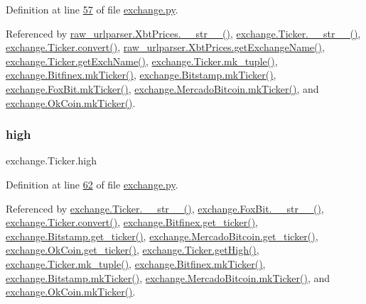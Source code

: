 Definition at line \hyperlink{exchange_8py_source_l00057}{57} of file \hyperlink{exchange_8py_source}{exchange.\+py}.



Referenced by \hyperlink{raw__urlparser_8py_source_l00074}{raw\+\_\+urlparser.\+Xbt\+Prices.\+\_\+\+\_\+str\+\_\+\+\_\+()}, \hyperlink{exchange_8py_source_l00136}{exchange.\+Ticker.\+\_\+\+\_\+str\+\_\+\+\_\+()}, \hyperlink{exchange_8py_source_l00069}{exchange.\+Ticker.\+convert()}, \hyperlink{raw__urlparser_8py_source_l00068}{raw\+\_\+urlparser.\+Xbt\+Prices.\+get\+Exchange\+Name()}, \hyperlink{exchange_8py_source_l00091}{exchange.\+Ticker.\+get\+Exch\+Name()}, \hyperlink{exchange_8py_source_l00121}{exchange.\+Ticker.\+mk\+\_\+tuple()}, \hyperlink{exchange_8py_source_l00453}{exchange.\+Bitfinex.\+mk\+Ticker()}, \hyperlink{exchange_8py_source_l00525}{exchange.\+Bitstamp.\+mk\+Ticker()}, \hyperlink{exchange_8py_source_l00584}{exchange.\+Fox\+Bit.\+mk\+Ticker()}, \hyperlink{exchange_8py_source_l00665}{exchange.\+Mercado\+Bitcoin.\+mk\+Ticker()}, and \hyperlink{exchange_8py_source_l00730}{exchange.\+Ok\+Coin.\+mk\+Ticker()}.

\mbox{\label{classexchange_1_1_ticker_aace381ca15468df6a40e8d86b7710a7f}} 
\subsubsection{\texorpdfstring{high}{high}}
{\footnotesize\ttfamily exchange.\+Ticker.\+high}



Definition at line \hyperlink{exchange_8py_source_l00062}{62} of file \hyperlink{exchange_8py_source}{exchange.\+py}.



Referenced by \hyperlink{exchange_8py_source_l00136}{exchange.\+Ticker.\+\_\+\+\_\+str\+\_\+\+\_\+()}, \hyperlink{exchange_8py_source_l00610}{exchange.\+Fox\+Bit.\+\_\+\+\_\+str\+\_\+\+\_\+()}, \hyperlink{exchange_8py_source_l00069}{exchange.\+Ticker.\+convert()}, \hyperlink{exchange_8py_source_l00439}{exchange.\+Bitfinex.\+get\+\_\+ticker()}, \hyperlink{exchange_8py_source_l00511}{exchange.\+Bitstamp.\+get\+\_\+ticker()}, \hyperlink{exchange_8py_source_l00651}{exchange.\+Mercado\+Bitcoin.\+get\+\_\+ticker()}, \hyperlink{exchange_8py_source_l00716}{exchange.\+Ok\+Coin.\+get\+\_\+ticker()}, \hyperlink{exchange_8py_source_l00106}{exchange.\+Ticker.\+get\+High()}, \hyperlink{exchange_8py_source_l00121}{exchange.\+Ticker.\+mk\+\_\+tuple()}, \hyperlink{exchange_8py_source_l00453}{exchange.\+Bitfinex.\+mk\+Ticker()}, \hyperlink{exchange_8py_source_l00525}{exchange.\+Bitstamp.\+mk\+Ticker()}, \hyperlink{exchange_8py_source_l00665}{exchange.\+Mercado\+Bitcoin.\+mk\+Ticker()}, and \hyperlink{exchange_8py_source_l00730}{exchange.\+Ok\+Coin.\+mk\+Ticker()}.

